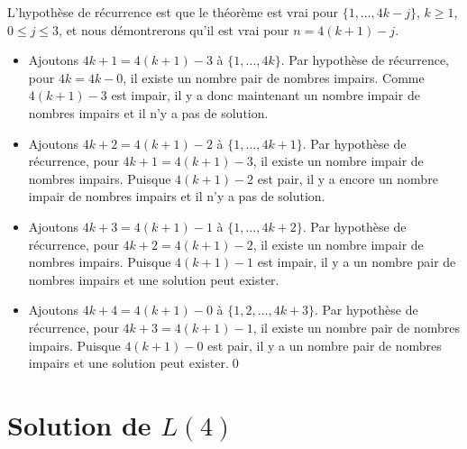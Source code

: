 L'hypothèse de récurrence est que le théorème est vrai pour $\{1,\ldots,4k-j\}$, $k\ge 1$, $0\leq j\leq 3$, et nous démontrerons qu'il est vrai pour $n=4(k+1)-j$.

\begin{itemize}
\item Ajoutons $4k+1=4(k+1)-3$ à $\{1,\ldots,4k\}$. Par hypothèse de récurrence, pour $4k=4k-0$, il existe un nombre pair de nombres impairs. Comme $4(k+1)-3$ est impair, il y a donc maintenant un nombre impair de nombres impairs et il n'y a pas de solution.
\item Ajoutons $4k+2=4(k+1)-2$ à $\{1,\ldots,4k+1\}$. Par hypothèse de récurrence, pour $4k+1=4(k+1)-3$, il existe un nombre impair de nombres impairs. Puisque $4(k+1)-2$ est pair,  il y a encore un nombre impair de nombres impairs et il n'y a pas de solution.
\item Ajoutons $4k+3=4(k+1)-1$ à $\{1,\ldots,4k+2\}$. Par hypothèse de récurrence, pour $4k+2=4(k+1)-2$, il existe un nombre impair de nombres impairs. Puisque $4(k+1)-1$ est impair,  il y a un nombre pair de nombres impairs et une solution peut exister.
\item Ajoutons $4k+4=4(k+1)-0$ à $\{1,2,\ldots,4k+3\}$. Par hypothèse de récurrence, pour $4k+3=4(k+1)-1$, il existe un nombre pair de nombres impairs. Puisque $4(k+1)-0$ est pair, il y a  un nombre pair de nombres impairs et une solution peut  exister.\qed
\end{itemize}




\section{Solution de $L(4)$}\label{s.langford-four}


